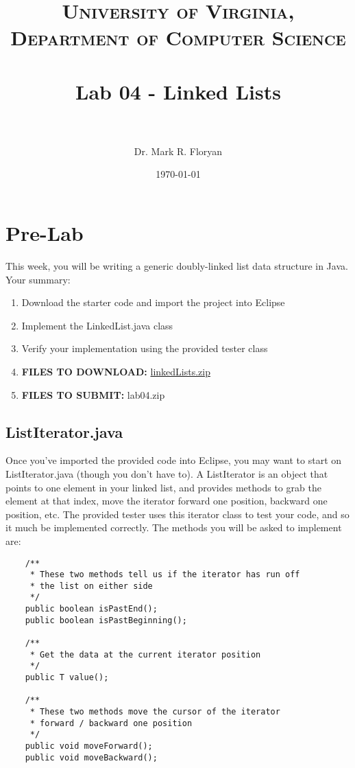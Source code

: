 \documentclass[paper=a4, fontsize=11pt, parskip=full]{scrartcl} %
\title{
\normalfont \normalsize
\textsc{University of Virginia, Department of Computer Science} \\ [25pt] %
\horrule{0.5pt} \\[0.4cm] %
\huge Lab 04 - Linked Lists \\ %
\horrule{2pt} \\[0.5cm] %
}
\author{Dr. Mark R. Floryan} %
\date{\normalsize\today} %
\numberwithin{equation}{section} %
\numberwithin{figure}{section} %
\numberwithin{table}{section} %
\begin{document}
\maketitle %


\section{Pre-Lab}

This week, you will be writing a generic doubly-linked list data structure in Java. Your summary:

\begin{enumerate}
	\item Download the starter code and import the project into Eclipse
	\item Implement the LinkedList.java class
	\item Verify your implementation using the provided tester class
	\item \textbf{FILES TO DOWNLOAD:} \href{https://markfloryan.github.io/dsa1/labs/lab04%20-%20LinkedLists/code/linkedlists.zip}{linkedLists.zip}
	\item \textbf{FILES TO SUBMIT:} lab04.zip
\end{enumerate}


\subsection{ListIterator.java}

Once you've imported the provided code into Eclipse, you may want to start on ListIterator.java (though you don't have to). A ListIterator is an object that points to one element in your linked list, and provides methods to grab the element at that index, move the iterator forward one position, backward one position, etc. The provided tester uses this iterator class to test your code, and so it much be implemented correctly. The methods you will be asked to implement are:

\begin{lstlisting}
	/**
	 * These two methods tell us if the iterator has run off
	 * the list on either side
	 */
	public boolean isPastEnd();
	public boolean isPastBeginning();

	/**
	 * Get the data at the current iterator position
	 */
	public T value();

	/**
	 * These two methods move the cursor of the iterator
	 * forward / backward one position
	 */
	public void moveForward();
	public void moveBackward();
\end{lstlisting}
\end{document}
